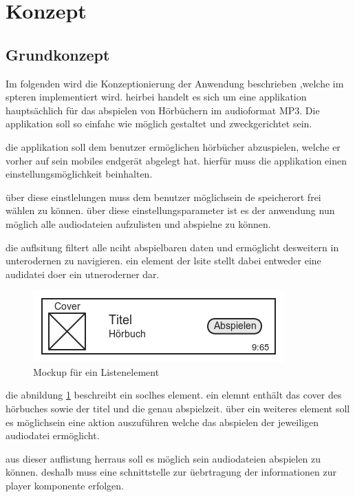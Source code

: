 \section{Konzept}
\subsection{Grundkonzept}

Im folgenden wird die Konzeptionierung der Anwendung beschrieben ,welche im spteren implementiert wird. heirbei handelt es sich um eine applikation hauptsächlich für das abspielen von Hörbüchern im audioformat MP3. Die applikation soll so einfahc wie möglich gestaltet und zweckgerichtet sein.

die applikation soll dem benutzer ermöglichen hörbücher abzuspielen, welche er vorher auf sein mobiles endgerät abgelegt hat. hierfür muss die applikation einen einstellungsmöglichkeit beinhalten.

über diese einstlelungen muss dem benutzer möglichsein de speicherort frei wählen zu können. über diese einstellungsparameter ist es der anwendung nun möglich alle audiodateien aufzulisten und abspielne zu können.

die auflsitung filtert alle nciht abspielbaren daten und ermöglicht desweitern in unterodernen zu navigieren. ein element der lsite stellt dabei entweder eine audidatei doer ein utneroderner dar. 

\begin{figure}
\begin{center}
\includegraphics[scale=0.8]{images/listitem}
\caption{Mockup für ein Listenelement}
\label{mocklistel}
\end{center}
\end{figure}

die abnildung \ref{mocklistel} beschreibt ein soclhes element. ein elemnt enthält das cover des hörbuches sowie der titel und die genau abspielzeit. über ein weiteres element soll es möglichsein eine aktion auszuführen welche das abspielen der jeweiligen audiodatei ermöglicht.

aus dieser auflistung herraus soll es möglich sein audiodateien abspielen zu können. deshalb muss eine schnittstelle zur üebrtragung der informationen zur player komponente erfolgen.

